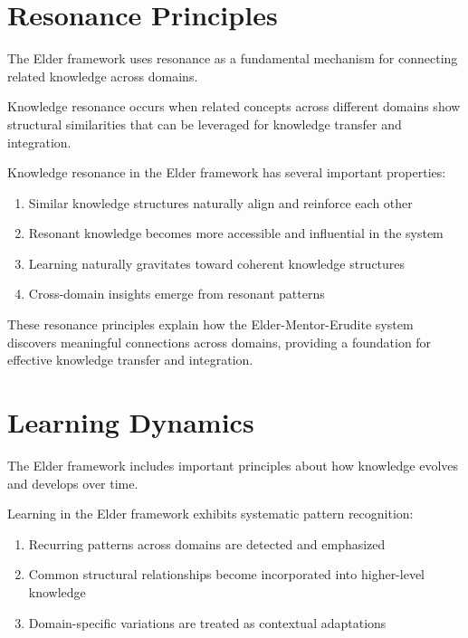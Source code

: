 \section{Resonance Principles}

The Elder framework uses resonance as a fundamental mechanism for connecting related knowledge across domains.

\begin{definition}
Knowledge resonance occurs when related concepts across different domains show structural similarities that can be leveraged for knowledge transfer and integration.
\end{definition}

\begin{theorem}
Knowledge resonance in the Elder framework has several important properties:
\begin{enumerate}
    \item Similar knowledge structures naturally align and reinforce each other
    \item Resonant knowledge becomes more accessible and influential in the system
    \item Learning naturally gravitates toward coherent knowledge structures
    \item Cross-domain insights emerge from resonant patterns
\end{enumerate}
\end{theorem}

These resonance principles explain how the Elder-Mentor-Erudite system discovers meaningful connections across domains, providing a foundation for effective knowledge transfer and integration.

\section{Learning Dynamics}

The Elder framework includes important principles about how knowledge evolves and develops over time.

\begin{theorem}
Learning in the Elder framework exhibits systematic pattern recognition:
\begin{enumerate}
    \item Recurring patterns across domains are detected and emphasized
    \item Common structural relationships become incorporated into higher-level knowledge
    \item Domain-specific variations are treated as contextual adaptations
\end{enumerate}
\end{theorem}

